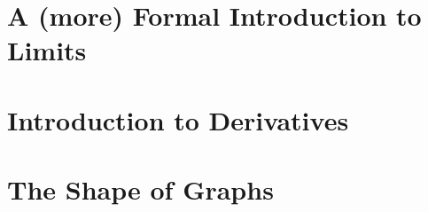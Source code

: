 \section{A (more) Formal Introduction to Limits}



\newpage

\section{Introduction to Derivatives}



\newpage

\section{The Shape of Graphs}


